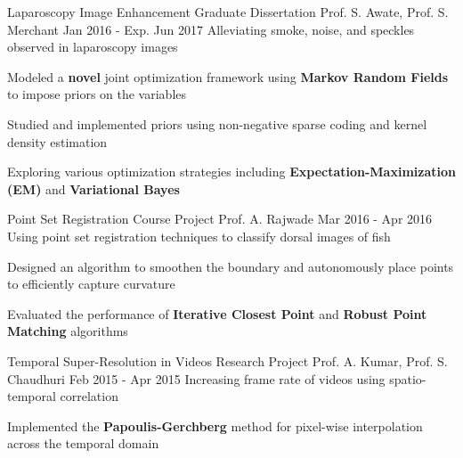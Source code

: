 \begin{cventries}
\projectentry
{Laparoscopy Image Enhancement} %
{Graduate Dissertation} %
{Prof. S. Awate, Prof. S. Merchant} %
{Jan 2016 - Exp. Jun 2017} %
{Alleviating smoke, noise, and speckles observed in laparoscopy images} %
{ %
    \begin{cvitems}
        \item {Modeled a \textbf{novel} joint optimization framework using \textbf{Markov Random Fields} to impose priors on the variables}
        \item {Studied and implemented priors using non-negative sparse coding and kernel density estimation}
        \item {Exploring various optimization strategies including \textbf{Expectation-Maximization (EM)} and \textbf{Variational Bayes}}
    \end{cvitems}
}
%
\projectentry
{Point Set Registration} %
{Course Project} %
{Prof. A. Rajwade} %
{Mar 2016 - Apr 2016} %
{Using point set registration techniques to classify dorsal images of fish} %
{ %
\begin{cvitems}
    \item {Designed an algorithm to smoothen the boundary and autonomously place points to efficiently capture curvature}
    \item {Evaluated the performance of \textbf{Iterative Closest Point} and \textbf{Robust Point Matching} algorithms}
\end{cvitems}
}
\projectentry
{Temporal Super-Resolution in Videos} %
{Research Project} %
{Prof. A. Kumar, Prof. S. Chaudhuri} %
{Feb 2015 - Apr 2015} %
{Increasing frame rate of videos using spatio-temporal correlation} %
{ %
    \begin{cvitems}
        \item {Implemented the \textbf{Papoulis-Gerchberg} method for pixel-wise interpolation across the temporal domain}

\end{cvitems}}
\end{cventries}
